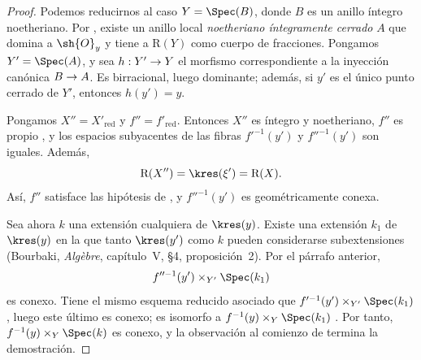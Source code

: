 \documentclass[oneside]{amsart}
\makeatletter
\newcommand{\ega@arrow}[2]{\mathchoice{#1}{#2}{#2}{#2}}
\renewcommand{\to}{\ega@arrow{\longrightarrow}{\rightarrow}}
\newcommand{\oldpage}[2][]{{\marginnote{\normalfont\textbf{#1}~|~#2}}\ignorespaces}
\makeatother
\begin{document}
\begin{proof}
Podemos reducirnos al caso $Y=\Spec(B)$, donde $B$ es un anillo
íntegro noetheriano. Por , existe un anillo local
\emph{noetheriano íntegramente cerrado} $A$ que domina a $\sh{O}_y$ y tiene a
$\mathrm{R}(Y)$ como cuerpo de fracciones. Pongamos $Y'=\Spec(A)$, y
sea $h:Y'\to Y$ el morfismo correspondiente a la inyección canónica
$B\to A$. Es birracional, luego dominante; además, si $y'$ es el
único punto cerrado de $Y'$, entonces $h(y')=y$.


\oldpage[III]{134}

Pongamos $X''=X'_{\mathrm{red}}$ y $f''=f'_{\mathrm{red}}$. Entonces
$X''$ es íntegro y noetheriano, $f''$ es propio
, y los espacios subyacentes de las fibras
$f'^{-1}(y')$ y $f''^{-1}(y')$ son iguales. Además,
\[
  \mathrm{R}(X'')=\kres(\xi')=\mathrm{R}(X).
\]
Así, $f''$ satisface las hipótesis de , y
$f''^{-1}(y')$ es geométricamente conexa.

Sea ahora $k$ una extensión cualquiera de $\kres(y)$. Existe una
extensión $k_1$ de $\kres(y)$ en la que tanto $\kres(y')$ como $k$
pueden considerarse subextensiones (Bourbaki, \emph{Alg\`ebre},
capítulo~V, \S4, proposición~2). Por el párrafo anterior,
\[
  f''^{-1}(y')\times_{Y'}\Spec(k_1)
\]
es conexo. Tiene el mismo esquema reducido asociado que
$f'^{-1}(y')\times_{Y'}\Spec(k_1)$
, luego este último es conexo; es isomorfo a
$f^{-1}(y)\times_Y\Spec(k_1)$ . Por tanto,
$f^{-1}(y)\times_Y\Spec(k)$ es conexo, y la observación al comienzo
de  termina la demostración.
\end{proof}
\end{document}
